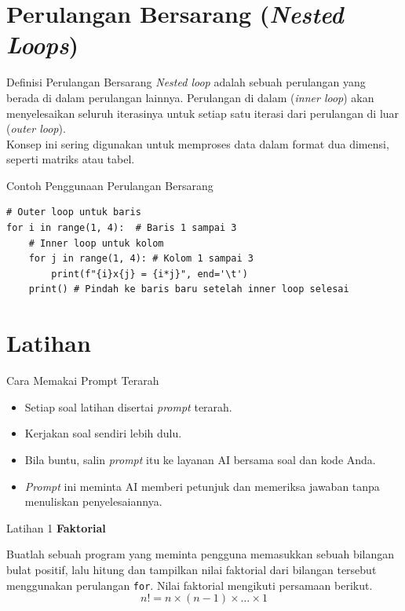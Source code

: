 \documentclass[aspectratio=169, table]{beamer}
\begin{document}
\section{Perulangan Bersarang (\textit{Nested Loops})}
\begin{frame}{Definisi Perulangan Bersarang}
\textit{Nested loop} adalah sebuah perulangan yang berada di dalam perulangan lainnya. Perulangan di dalam (\textit{inner loop}) akan menyelesaikan seluruh iterasinya untuk setiap satu iterasi dari perulangan di luar (\textit{outer loop}).
\\
Konsep ini sering digunakan untuk memproses data dalam format dua dimensi, seperti matriks atau tabel.
\end{frame}

\begin{frame}[fragile]{Contoh Penggunaan Perulangan Bersarang}
\begin{lstlisting}[style=PythonStyle, caption={Kode Python: nested_loop.py}]
# Outer loop untuk baris
for i in range(1, 4):  # Baris 1 sampai 3
    # Inner loop untuk kolom
    for j in range(1, 4): # Kolom 1 sampai 3
        print(f"{i}x{j} = {i*j}", end='\t')
    print() # Pindah ke baris baru setelah inner loop selesai
\end{lstlisting}
\end{frame}

\section{Latihan}
\begin{frame}{Cara Memakai Prompt Terarah}
\begin{itemize}
\item Setiap soal latihan disertai \textit{prompt} terarah.
\item Kerjakan soal sendiri lebih dulu.
\item Bila buntu, salin \textit{prompt} itu ke layanan AI bersama soal dan kode Anda.
\item \textit{Prompt} ini meminta AI memberi petunjuk dan memeriksa jawaban tanpa menuliskan penyelesaiannya.
\end{itemize}
\end{frame}

\begin{frame}[fragile,allowframebreaks=0.8]{Latihan 1}
\footnotesize
\textbf{Faktorial}\par\medskip
Buatlah sebuah program yang meminta pengguna memasukkan sebuah bilangan bulat positif, lalu hitung dan tampilkan nilai faktorial dari bilangan tersebut menggunakan perulangan \texttt{for}. Nilai faktorial mengikuti persamaan berikut.
    \begin{equation}
      n! = n \times (n-1) \times \dots \times 1
    \end{equation}
\end{frame}
\end{document}

